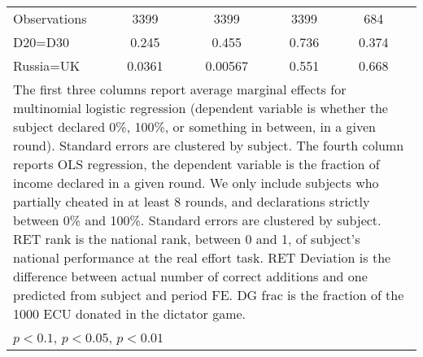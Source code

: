 \begin{tabular}{l|cccccc|cc}
\hline
Observations    &     3399         &         &     3399         &         &     3399         &         &      684         &         \\
D20=D30         &    0.245         &         &    0.455         &         &    0.736         &         &    0.374         &         \\
Russia=UK       &   0.0361         &         &  0.00567         &         &    0.551         &         &    0.668         &         \\
\hline\hline
\multicolumn{9}{p{16cm}}{\tiny The first three columns report average marginal effects for multinomial logistic regression (dependent variable is whether the subject declared 0\%, 100\%, or something in between, in a given round). Standard errors are clustered by subject. The fourth column reports OLS regression, the dependent variable is the fraction of income declared in a given round. We only include subjects who partially cheated in at least 8 rounds, and declarations strictly between 0\% and 100\%. Standard errors are clustered by subject. RET rank is the national rank, between 0 and 1, of subject's national performance at the real effort task. RET Deviation is the difference between actual number of correct additions and one predicted from subject and period FE. DG frac is the fraction of the 1000 ECU donated in the dictator game.}\\
\multicolumn{9}{l}{\tiny \sym{*} \(p<0.1\), \sym{**} \(p<0.05\), \sym{***} \(p<0.01\)}\\
\end{tabular}